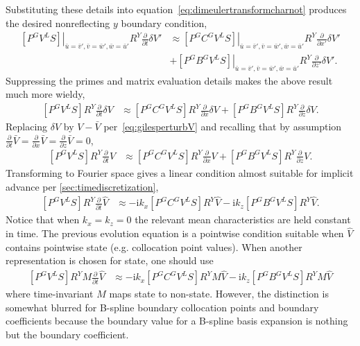 \documentclass[letterpaper,11pt,nointlimits,reqno,draft]{amsbook}
\newcommand{\ii}{\ensuremath{\mathrm{i}}}
\begin{document}
Substituting these details into equation~\eqref{eq:dimeulertransformcharnot}
produces the desired nonreflecting $y$ boundary condition,
\begin{align}
\label{eq:dimeulertransformcharnotYwieldy}
\left.\left[
  P^G V^L S
\right]\right|_{\bar{u}=\bar{v}', \bar{v}=\bar{w}', \bar{w}=\bar{u}'}
  R^Y
  \frac{\partial}{\partial{}t}
  \delta{}V'
&\approx
\left.\left[
  P^G C^G V^L S
\right]\right|_{\bar{u}=\bar{v}', \bar{v}=\bar{w}', \bar{w}=\bar{u}'}
  R^Y
  \frac{\partial}{\partial{}x'}
  \delta{}V'
\\&+
\left.\left[
  P^G B^G V^L S
\right]\right|_{\bar{u}=\bar{v}', \bar{v}=\bar{w}', \bar{w}=\bar{u}'}
  R^Y
  \frac{\partial}{\partial{}z'}
  \delta{}V'
.
\end{align}
Suppressing the primes and matrix evaluation details makes the above result
much more wieldy,
\begin{align}
\label{eq:dimeulertransformcharnotYphys}
  \left[P^G V^L S\right]
  R^Y
  \frac{\partial}{\partial{}t}
  \delta{}V
&\approx
  \left[P^G C^G V^L S\right]
  R^Y
  \frac{\partial}{\partial{}x}
  \delta{}V
  +
  \left[P^G B^G V^L S\right]
  R^Y
  \frac{\partial}{\partial{}z}
  \delta{}V
.
\end{align}
Replacing $\delta{}V$ by $V - \bar{V}$ per~\eqref{eq:gilesperturbV} and
recalling that by assumption
$
    \frac{\partial}{\partial{}t} \bar{V}
  = \frac{\partial}{\partial{}x} \bar{V}
  = \frac{\partial}{\partial{}z} \bar{V}
  = 0
$,
\begin{align}
  \left[P^G V^L S\right]
  R^Y
  \frac{\partial}{\partial{}t}
  V
&\approx
  \left[P^G C^G V^L S\right]
  R^Y
  \frac{\partial}{\partial{}x}
  V
  +
  \left[P^G B^G V^L S\right]
  R^Y
  \frac{\partial}{\partial{}z}
  V
.
\end{align}
Transforming to Fourier space gives a linear condition almost suitable for
implicit advance per \autoref{sec:timediscretization},
\begin{align}
  \left[P^G V^L S\right]
  R^Y
  \frac{\partial}{\partial{}t}
  \hat{V}
&\approx
  -
  \ii k_x
  \left[P^G C^G V^L S\right]
  R^Y
  \hat{V}
  -
  \ii k_z
  \left[P^G B^G V^L S\right]
  R^Y
  \hat{V}
.
\end{align}
Notice that when $k_x=k_z=0$ the relevant mean characteristics are held
constant in time.  The previous evolution equation is a pointwise condition
suitable when $\hat{V}$ contains pointwise state (e.g. collocation point
values).  When another representation is chosen for state, one should use
\begin{align}
\label{eq:dimeulertransformcharnotYwave}
  \left[P^G V^L S\right]
  R^Y
  M \frac{\partial}{\partial{}t}
  \hat{V}
&\approx
  -
  \ii k_x
  \left[P^G C^G V^L S\right]
  R^Y
  M \hat{V}
  -
  \ii k_z
  \left[P^G B^G V^L S\right]
  R^Y
  M \hat{V}
\end{align}
where time-invariant $M$ maps state to non-state.  However, the distinction is
somewhat blurred for B-spline boundary collocation points and boundary
coefficients because the boundary value for a B-spline basis expansion is
nothing but the boundary coefficient.
\end{document}
